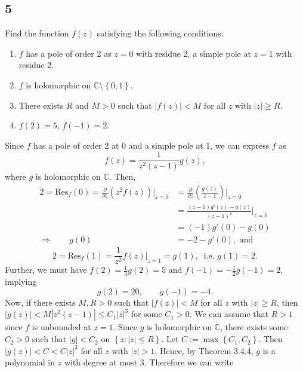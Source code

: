 \documentclass[12pt]{article}
\begin{document}
\subsection*{5}
\begin{tcolorbox}
Find the function $f(z)$ satisfying the following conditions:
\begin{enumerate}[label=(\alph*)]
\item $f$ has a pole of order 2 as $z = 0$ with residue 2, a simple pole at $z = 1$ with residue 2.
\item $f$ is holomorphic on $\mathbb{C} \setminus \left\{ 0,1 \right\}$.
\item There exists $R$ and $M > 0$ such that $|f(z)| < M$ for all $z$ with $|z| \geq R$.
\item $f(2) = 5$, $f(-1) = 2$.
\end{enumerate}
\end{tcolorbox}
Since $f$ has a pole of order 2 at 0 and a simple pole at 1, we can express $f$ as
\[ f(z) = \frac{1}{z^{2}(z-1)}g(z), \]
where $g$ is holomorphic on $\mathbb{C}$. Then,
\begin{align}
2 = \text{Res}_{f}(0) = \frac{\partial }{\partial z}\left( z^{2}f(z) \right)\bigg|_{z=0} & = \frac{\partial }{\partial z}\left( \frac{g(z)}{z-1}
\right)\bigg|_{z = 0} \nonumber \\
& = \frac{(z-1)g'(z) - g(z)}{(z-1)^{2}}\bigg|_{z=0}\nonumber \\
& = (-1)g'(0) - g(0) \nonumber \\
\Rightarrow  \qquad g(0) & = -2 - g'(0), \text{ and }\label{5.1}
\end{align}
\begin{equation}
2 = \text{Res}_{f}(1) = \frac{1}{z^{2}}f(z)\bigg|_{z = 1} = g(1), \ \text{ i.e. } g(1) = 2.
\label{5.2}
\end{equation}
Further, we must have $f(2) = \frac{1}{4}g(2) = 5$ and $f(-1) = -\frac{1}{2}g(-1) = 2$, implying
\begin{equation}
g(2) = 20, \qquad g(-1) = -4.
\label{5.3}
\end{equation}
Now, if there exists $M, R > 0$ such that $|f(z)| < M$ for all $z$ with $|z| \geq R$, then $|g(z)| < M|z^{2}(z-1)| \leq C_{1}|z|^{3}$ for some $C_{1} > 0$.
We can assume that $R > 1$ since $f$ is unbounded at $z = 1$. Since $g$ is holomorphic on $\mathbb{C}$, there exists some $C_{2} > 0$ such that $|g| <
C_{2}$ on $\left\{ z : |z| \leq R \right\}$. Let $C := \max\left\{ C_1, C_2 \right\}$. Then $|g(z)| < C < C|z|^{3}$ for all $z$ with $|z| > 1$. Hence,
by Theorem 3.4.4, $g$ is a polynomial in $z$ with degree at most $3$. Therefore we can write
\end{document}
